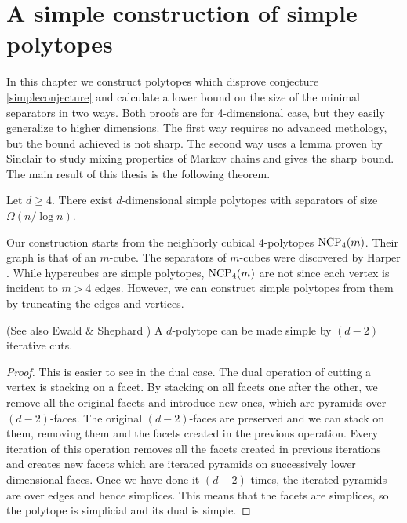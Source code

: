 \chapter{A simple construction of simple polytopes}

In this chapter we construct polytopes which disprove conjecture \ref{simpleconjecture} and
calculate a lower bound on the size of the minimal separators in two ways. Both proofs are for 
4-dimensional case, but they easily generalize to higher dimensions. The first way requires
no advanced methology, but the bound achieved is not sharp. The second way uses a lemma proven by Sinclair
to study mixing properties of Markov chains and gives the sharp bound. The main result of this
thesis is the following theorem.


\begin{theorem}
\label{maintheorem}
 Let $d\geq 4$. There exist $d$-dimensional simple polytopes with
separators of size $\Omega(n/\log n)$.
\end{theorem}

Our construction starts from the neighborly cubical 4-polytopes $\textrm{NCP}_4(m)$. 
Their graph is that of an $m$-cube. The separators of $m$-cubes were discovered by Harper 
\cite{Harp}.
While hypercubes are simple polytopes, $\textrm{NCP}_4(m)$ are not since each vertex is 
incident to $m>4$ edges. However, we can construct simple polytopes from them by 
truncating the edges and vertices.

 

\begin{lemma}
(See also Ewald \& Shephard \cite{EwSh}) A $d$-polytope can be made simple 
by $(d-2)$ iterative cuts.
\end{lemma}

\begin{proof}
This is easier to see in the dual case. The dual operation of cutting a vertex 
is stacking on a facet. By stacking on all facets one after the other, we 
remove all the original facets and introduce new ones, which are pyramids over 
$(d-2)$-faces. The original $(d-2)$-faces are preserved and we can stack on 
them, removing them and the facets created in the previous operation. Every 
iteration of this operation removes all the facets created in previous 
iterations and creates new facets which are iterated pyramids on successively 
lower dimensional faces. Once we have done it $(d-2)$ times, the iterated 
pyramids are over edges and hence simplices. This means that the facets are 
simplices, so the polytope is simplicial and its dual is simple.
\end{proof}

